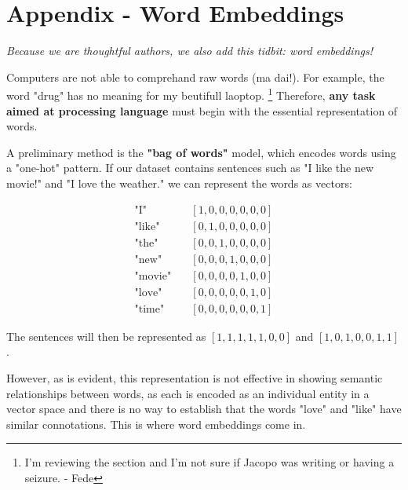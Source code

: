 \section{Appendix - Word Embeddings}

\textit{Because we are thoughtful authors, we also add this tidbit: word embeddings!}

Computers are not able to comprehand raw words (ma dai!). For example, the word "drug" has no meaning for my beutifull laoptop. \footnote{I'm reviewing the section and I'm not sure if Jacopo was writing or having a seizure.  - Fede} Therefore, \textbf{any task aimed at processing language} must begin with the essential representation of words.

A preliminary method is the \textbf{"bag of words"} model, which encodes words using a "one-hot" pattern. If our dataset contains sentences such as "I like the new movie!" and "I love the weather." we can represent the words as vectors:

\vspace{-1cm}
\begin{minipage}[t]{0.45\textwidth}
\begin{align*}
\text{"I"} \quad &[1,0,0,0,0,0,0] \\
\text{"like"} \quad &[0,1,0,0,0,0,0] \\
\text{"the"} \quad &[0,0,1,0,0,0,0] \\
\text{"new"} \quad &[0,0,0,1,0,0,0] \\
\text{"movie"}\quad  &[0,0,0,0,1,0,0] \\
\text{"love"} \quad &[0,0,0,0,0,1,0] \\
\text{"time"} \quad &[0,0,0,0,0,0,1]
\end{align*}
\end{minipage}
\begin{minipage}[t]{0.45\textwidth}
\vspace{2cm}
\begin{center}
The sentences will then be represented as $[1,1,1,1,1,0,0]$ and $[1,0,1,0,0,1,1]$.
\end{center}
\end{minipage}
\begin{minipage}[t]{0.1\textwidth}
\end{minipage}

However, as is evident, this representation is not effective in showing semantic relationships between words, as each is encoded as an individual entity in a vector space and there is no way to establish that the words "love" and "like" have similar connotations. This is where word embeddings come in.

